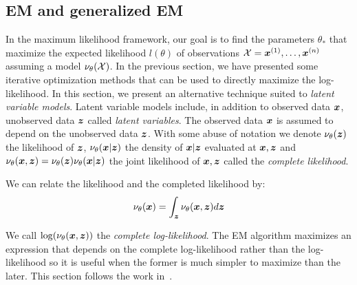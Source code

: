 \subsection{EM and generalized EM}
In the maximum likelihood framework, our goal is to find the parameters
$\theta_*$ that maximize the expected likelihood $l(\theta)$ of
observations $\mathcal{X} = \boldsymbol{x}^{(1)}, \dots, \boldsymbol{x}^{(n)}$ assuming a model
$\nu_{\theta}(\mathcal{X})$.
In the previous section, we have presented some iterative
optimization methods that can be used to directly maximize the log-likelihood.
In this section, we present an alternative technique suited to
\emph{latent variable models}.
Latent variable models include, in addition to observed data $\boldsymbol{x}$, unobserved data $\boldsymbol{z}$ called \emph{latent variables}. The observed data $\boldsymbol{x}$ is assumed to depend on the
unobserved data $\boldsymbol{z}$.
With some abuse of notation we denote $\nu_{\theta}(\boldsymbol{z})$
the likelihood of $\boldsymbol{z}$, $\nu_{\theta}(\boldsymbol{x} | \boldsymbol{z})$ the density of $\boldsymbol{x} | \boldsymbol{z}$
evaluated at $\boldsymbol{x}, \boldsymbol{z}$ and $\nu_{\theta}(\boldsymbol{x}, \boldsymbol{z}) =
\nu_{\theta}(\boldsymbol{z}) \nu_{\theta}(\boldsymbol{x} | \boldsymbol{z})$ the joint likelihood of $\boldsymbol{x}, \boldsymbol{z}$ called the
\emph{complete likelihood}.  

We can relate the likelihood and the completed likelihood by:
\begin{align}
  \nu_{\theta}(\boldsymbol{x}) = \int_{\boldsymbol{z}} \nu_{\theta}(\boldsymbol{x}, \boldsymbol{z}) d\boldsymbol{z}
\end{align}

We call $\log(\nu_{\theta}(\boldsymbol{x}, \boldsymbol{z}))$ the \emph{complete log-likelihood}.
The EM algorithm maximizes an expression
that depends on the complete log-likelihood rather than the log-likelihood so it
is useful when the former is much simpler to maximize than the later.
This section follows the work in~\cite{neal1998view}.

